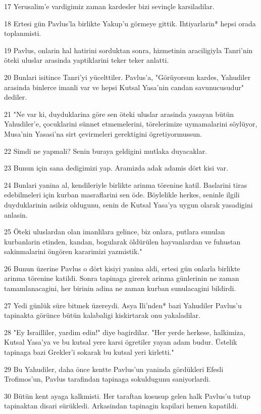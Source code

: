 \par 17 Yerusalim'e vardigimiz zaman kardesler bizi sevinçle karsiladilar.
\par 18 Ertesi gün Pavlus'la birlikte Yakup'u görmeye gittik. Ihtiyarlarin* hepsi orada toplanmisti.
\par 19 Pavlus, onlarin hal hatirini sorduktan sonra, hizmetinin araciligiyla Tanri'nin öteki uluslar arasinda yaptiklarini teker teker anlatti.
\par 20 Bunlari isitince Tanri'yi yücelttiler. Pavlus'a, "Görüyorsun kardes, Yahudiler arasinda binlerce imanli var ve hepsi Kutsal Yasa'nin candan savunucusudur" dediler.
\par 21 "Ne var ki, duyduklarina göre sen öteki uluslar arasinda yasayan bütün Yahudiler'e, çocuklarini sünnet etmemelerini, törelerimize uymamalarini söylüyor, Musa'nin Yasasi'na sirt çevirmeleri gerektigini ögretiyormussun.
\par 22 Simdi ne yapmali? Senin buraya geldigini mutlaka duyacaklar.
\par 23 Bunun için sana dedigimizi yap. Aramizda adak adamis dört kisi var.
\par 24 Bunlari yanina al, kendileriyle birlikte arinma törenine katil. Baslarini tiras edebilmeleri için kurban masraflarini sen öde. Böylelikle herkes, seninle ilgili duyduklarinin asilsiz oldugunu, senin de Kutsal Yasa'ya uygun olarak yasadigini anlasin.
\par 25 Öteki uluslardan olan imanlilara gelince, biz onlara, putlara sunulan kurbanlarin etinden, kandan, bogularak öldürülen hayvanlardan ve fuhustan sakinmalarini öngören kararimizi yazmistik."
\par 26 Bunun üzerine Pavlus o dört kisiyi yanina aldi, ertesi gün onlarla birlikte arinma törenine katildi. Sonra tapinaga girerek arinma günlerinin ne zaman tamamlanacagini, her birinin adina ne zaman kurban sunulacagini bildirdi.
\par 27 Yedi günlük süre bitmek üzereydi. Asya Ili'nden* bazi Yahudiler Pavlus'u tapinakta görünce bütün kalabaligi kiskirtarak onu yakaladilar.
\par 28 "Ey Israilliler, yardim edin!" diye bagirdilar. "Her yerde herkese, halkimiza, Kutsal Yasa'ya ve bu kutsal yere karsi ögretiler yayan adam budur. Üstelik tapinaga bazi Grekler'i sokarak bu kutsal yeri kirletti."
\par 29 Bu Yahudiler, daha önce kentte Pavlus'un yaninda gördükleri Efesli Trofimos'un, Pavlus tarafindan tapinaga sokuldugunu saniyorlardi.
\par 30 Bütün kent ayaga kalkmisti. Her taraftan kosusup gelen halk Pavlus'u tutup tapinaktan disari sürükledi. Arkasindan tapinagin kapilari hemen kapatildi.
